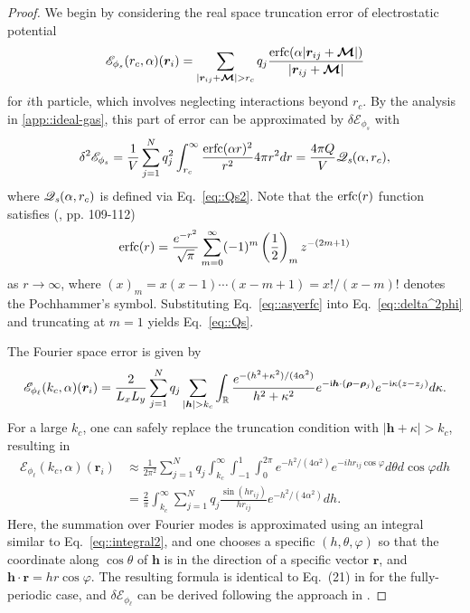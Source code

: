 \begin{proof}
	We begin by considering the real space truncation error of electrostatic potential 
	\begin{equation}
		\mathscr{E}_{\phi_{s}}(r_c,\alpha)(\bm{r}_{i}) = \sum_{|\bm{r}_{ij} + \V{\mathcal{M}}|>r_c}q_{j} \frac{\erfc(\alpha|\bm{r}_{ij} + \V{\mathcal{M}}|)}{|\bm{r}_{ij} + \V{\mathcal{M}}|}
	\end{equation}
	for $i$th particle, which involves neglecting interactions beyond $r_c$. By the analysis in \ref{app::ideal-gas}, this part of error can be approximated by $\delta\mathscr{E}_{\phi_{s}}$ with 
	\begin{equation}\label{eq::delta^2phi}
		\delta^2\mathscr{E}_{\phi_{s}}=  \frac{1}{V}\sum_{j=1}^{N}q_{j}^2\int_{r_c}^{\infty}\frac{\operatorname{erfc}(\alpha r)^2}{r^2}4\pi r^2dr=\frac{4\pi Q}{V}\mathscr{Q}_{\emph{s}}(\alpha,r_c),
	\end{equation}
	where $\mathscr{Q}_{\emph{s}}(\alpha,r_c)$ is defined via Eq.~\eqref{eq::Qs2}. Note that the $\operatorname{erfc}(r)$ function satisfies (\cite{olver1997asymptotics}, pp. 109-112)
	\begin{equation}\label{eq::asyerfc}
		\operatorname{erfc}(r)=\frac{e^{-r^2}}{\sqrt{\pi}}\sum_{m=0}^{\infty}(-1)^{m}\left(\frac{1}{2}\right)_mz^{-(2m+1)}
	\end{equation}
	as $r\rightarrow \infty$, where $(x)_m=x(x-1)\cdots(x-m+1)=x!/(x-m)!$ denotes the Pochhammer's symbol. Substituting Eq.~\eqref{eq::asyerfc} into Eq.~\eqref{eq::delta^2phi} and truncating at $m=1$ yields Eq.~\eqref{eq::Qs}. 

	The Fourier space error is given by
	\begin{equation}
		\mathscr{E}_{\phi_{\ell}}(k_c,\alpha)(\bm{r}_{i})=\frac{2}{L_xL_y}\sum_{j=1}^{N}q_{j}\sum_{|\bm{h}|>k_c}\int_{\mathbb{R}}\frac{e^{-(h^2+\kappa^2)/(4\alpha^2)}}{h^2+\kappa^2}e^{-\m{i} \bm{h}\cdot(\bm{\rho}-\bm{\rho}_{j})}e^{-\m{i} \kappa(z-z_{j})}d\kappa.
	\end{equation}
	For a large $k_c$, one can safely replace the truncation condition with $|\bm{h}+\kappa|>k_c$, resulting in
	\begin{equation}
		\begin{split}
			\mathscr{E}_{\phi_{\ell}}(k_c,\alpha)(\bm{r}_{i})&\approx \frac{1}{2\pi^2}\sum_{j=1}^{N}q_{j} \int_{k_c}^{\infty}\int_{-1}^{1}\int_{0}^{2\pi}e^{-h^2/(4\alpha^2)}e^{-i h r_{ij}\cos\varphi}d\theta d\cos\varphi dh\\
			&=\frac{2}{\pi}\int_{k_c}^{\infty}\sum_{j=1}^{N}q_{j}\frac{\sin(h r_{ij})}{h r_{ij}}e^{-h^2/(4\alpha^2)}dh.
		\end{split}
	\end{equation}
	Here, the summation over Fourier modes is approximated using an integral similar to Eq.~\eqref{eq::integral2}, and one chooses a specific $(h,\theta,\varphi)$ so that the coordinate along $\cos\theta$ of $\bm{h}$ is in the direction of a specific vector $\bm{r}$, and $\bm{h}\cdot\bm{r}=h r \cos\varphi$.
	The resulting formula is identical to Eq.~(21) in \cite{kolafa1992cutoff} for the fully-periodic case, and $\delta \mathscr{E}_{\phi_{\ell}}$ can be derived following the approach in \cite{kolafa1992cutoff}. 
\end{proof}

